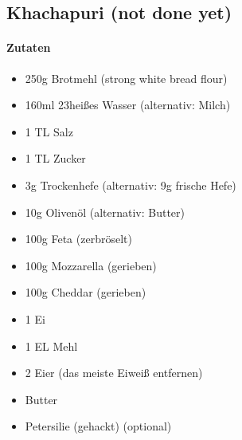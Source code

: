 \newpage
\subsection{Khachapuri (not done yet)}
\paragraph{Zutaten}
\begin{itemize}[noitemsep]
	\item 250g Brotmehl (strong white bread flour)
	\item 160ml 23\textdegree heißes Wasser (alternativ: Milch)
	\item 1 TL Salz
	\item 1 TL Zucker
	\item 3g Trockenhefe (alternativ: 9g frische Hefe)
	\item 10g Olivenöl (alternativ: Butter)
	\item 100g Feta (zerbröselt)
	\item 100g Mozzarella (gerieben)
	\item 100g Cheddar (gerieben)
	\item 1 Ei
	\item 1 EL Mehl
	\item 2 Eier (das meiste Eiweiß entfernen)
	\item Butter
	\item Petersilie (gehackt) (optional)
\end{itemize}
